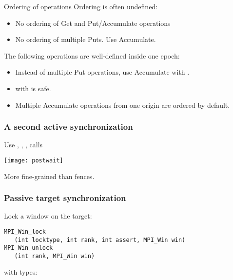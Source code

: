 \begin{frame}[containsverbatim]{Ordering of operations}
  Ordering is often undefined:
  \begin{itemize}
  \item No ordering of Get and Put/Accumulate operations
  \item No ordering of multiple Puts. Use Accumulate.
  \end{itemize}
  The following operations are well-defined inside one epoch:
  \begin{itemize}
  \item Instead of multiple Put operations, use Accumulate with
    .
  \item {} with
     is safe.
  \item Multiple Accumulate operations from one origin are ordered by
    default.
  \end{itemize} 
\end{frame}

\begin{optexerciseframe}[countdown]
  
\end{optexerciseframe}

\begin{frame}[containsverbatim]\frametitle{A second active synchronization}
  Use , ,
  ,  calls

  \texttt{[image: postwait]}

  More fine-grained than fences.
\end{frame}


\begin{frame}[containsverbatim]\frametitle{Passive target synchronization}
  Lock a window on the target:
\lstset{language=C}
\begin{lstlisting}
MPI_Win_lock
   (int locktype, int rank, int assert, MPI_Win win)
MPI_Win_unlock
   (int rank, MPI_Win win)
\end{lstlisting}
  with types:   
\end{frame}

\begin{exerciseframe}[onesidedbuild]
  
\end{exerciseframe}

